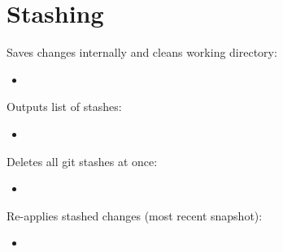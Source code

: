 \documentclass[a4paper, twocolumn]{article}
\newcommand{\insertshellcode}[2]{\begin{itemize}\item[]\end{itemize}} %
\begin{document}
\section{Stashing}
Saves changes internally and cleans working directory:
\insertshellcode{Scripts/stash/git_stash.txt}{}
%
Outputs list of stashes:
\insertshellcode{Scripts/stash/git_stash_list.txt}{}
%
Deletes all git stashes at once:
\insertshellcode{Scripts/stash/git_stash_clear.txt}{}
%
Re-applies stashed changes (most recent snapshot):
\insertshellcode{Scripts/stash/git_stash_pop.txt}{}
\end{document}
